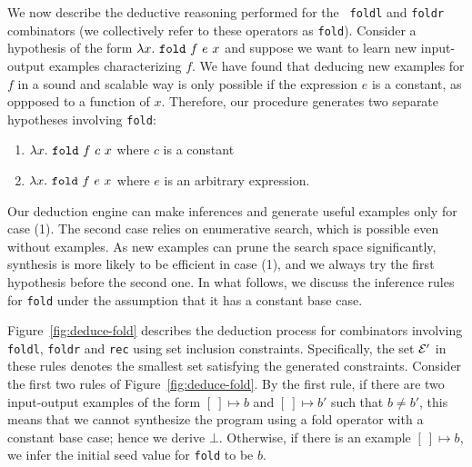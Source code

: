
We now describe the deductive reasoning performed for the {\tt
  foldl} and {\tt foldr} combinators (we collectively refer to these
operators as {\tt fold}).  Consider a hypothesis of the form
$\lambda x. \ {\tt fold} \  f \ e \ x$ and suppose we want to learn new
input-output examples characterizing $f$. We have found that deducing
new examples for $f$ in a sound and scalable way is only possible if the
expression $e$ is a constant, as oppposed to a function of
$x$. Therefore, our procedure generates two separate hypotheses
involving {\tt fold}:

\begin{enumerate}
\item $\lambda x. \ {\tt fold}  \ f \ c \ x$  where $c$ is a constant
\item $\lambda x. \ {\tt fold}  \ f \ e\ x$  where $e$ is an arbitrary expression.
\end{enumerate}

Our deduction engine can make inferences and generate useful examples
only for case (1).  The second case relies on enumerative search,
which is possible even without examples.  As new examples can prune
the search space significantly, synthesis is more likely to be
efficient in case (1), and we always try the first hypothesis before
the second one. In what follows, we discuss the inference rules for
{\tt fold} under the assumption that it has a constant base case.

Figure~\ref{fig:deduce-fold} describes the deduction process for
combinators involving {\tt foldl}, {\tt foldr} and {\tt rec} using set
inclusion constraints. Specifically, the set $\mathcal{E}'$ in these rules
denotes the smallest set satisfying the generated
constraints. Consider the first two rules of
Figure~\ref{fig:deduce-fold}. By the first rule, if there are two
input-output examples of the form $[\ ] \mapsto b$ and $[~] \mapsto
b'$ such that $b \neq b'$, this means that we cannot synthesize the
program using a fold operator with a constant base case; hence we
derive $\bot$. Otherwise, if there is an example $[~] \mapsto b$, we
infer the initial seed value for {\tt fold} to be $b$.

